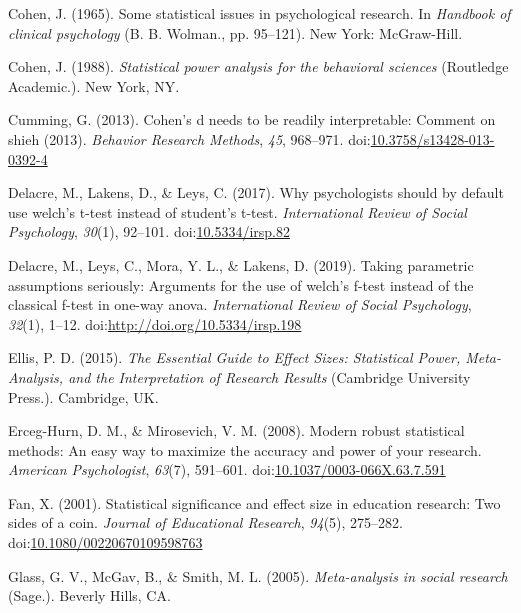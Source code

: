 \documentclass[
  man,floatsintext]{apa6}
\begin{document}
\leavevmode\hypertarget{ref-Cohen_1965}{}%
Cohen, J. (1965). Some statistical issues in psychological research. In \emph{Handbook of clinical psychology} (B. B. Wolman., pp. 95--121). New York: McGraw-Hill.

\leavevmode\hypertarget{ref-Cohen_1988}{}%
Cohen, J. (1988). \emph{Statistical power analysis for the behavioral sciences} (Routledge Academic.). New York, NY.

\leavevmode\hypertarget{ref-Cumming_2013}{}%
Cumming, G. (2013). Cohen's d needs to be readily interpretable: Comment on shieh (2013). \emph{Behavior Research Methods}, \emph{45}, 968--971. doi:\href{https://doi.org/10.3758/s13428-013-0392-4}{10.3758/s13428-013-0392-4}

\leavevmode\hypertarget{ref-Delacre_et_al_2017}{}%
Delacre, M., Lakens, D., \& Leys, C. (2017). Why psychologists should by default use welch's t-test instead of student's t-test. \emph{International Review of Social Psychology}, \emph{30}(1), 92--101. doi:\href{https://doi.org/10.5334/irsp.82}{10.5334/irsp.82}

\leavevmode\hypertarget{ref-Delacre_et_al_2019}{}%
Delacre, M., Leys, C., Mora, Y. L., \& Lakens, D. (2019). Taking parametric assumptions seriously: Arguments for the use of welch's f-test instead of the classical f-test in one-way anova. \emph{International Review of Social Psychology}, \emph{32}(1), 1--12. doi:\href{https://doi.org/http://doi.org/10.5334/irsp.198}{http://doi.org/10.5334/irsp.198}

\leavevmode\hypertarget{ref-Ellis_2015}{}%
Ellis, P. D. (2015). \emph{The Essential Guide to Effect Sizes: Statistical Power, Meta-Analysis, and the Interpretation of Research Results} (Cambridge University Press.). Cambridge, UK.

\leavevmode\hypertarget{ref-Erceg-Hurn_Mirosevich_2008}{}%
Erceg-Hurn, D. M., \& Mirosevich, V. M. (2008). Modern robust statistical methods: An easy way to maximize the accuracy and power of your research. \emph{American Psychologist}, \emph{63}(7), 591--601. doi:\href{https://doi.org/10.1037/0003-066X.63.7.591}{10.1037/0003-066X.63.7.591}

\leavevmode\hypertarget{ref-Fan_2001}{}%
Fan, X. (2001). Statistical significance and effect size in education research: Two sides of a coin. \emph{Journal of Educational Research}, \emph{94}(5), 275--282. doi:\href{https://doi.org/10.1080/00220670109598763}{10.1080/00220670109598763}

\leavevmode\hypertarget{ref-Glass_et_al_1981}{}%
Glass, G. V., McGav, B., \& Smith, M. L. (2005). \emph{Meta-analysis in social research} (Sage.). Beverly Hills, CA.
\end{document}
